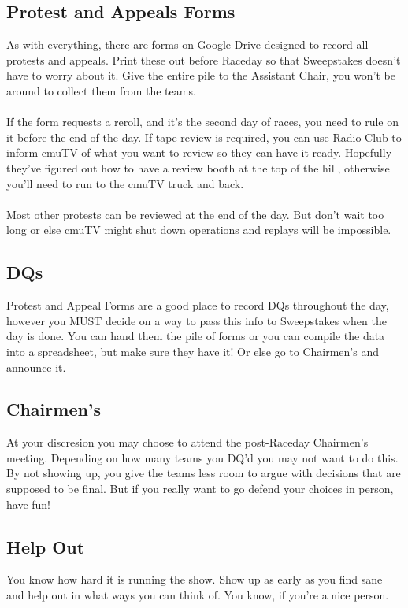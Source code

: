 \subsection{Protest and Appeals Forms}
As with everything, there are forms on Google Drive designed to record all
protests and appeals. Print these out before Raceday so that Sweepstakes
doesn't have to worry about it. Give the entire pile to the Assistant Chair,
you won't be around to collect them from the teams.
\\\\
If the form requests a reroll, and it's the second day of races, you need
to rule on it before the end of the day. If tape review is required, you can
use Radio Club to inform cmuTV of what you want to review so they can have it
ready. Hopefully they've figured out how to have a review booth at the top
of the hill, otherwise you'll need to run to the cmuTV truck and back.
\\\\
Most other protests can be reviewed at the end of the day. But don't wait too
long or else cmuTV might shut down operations and replays will be impossible.

\subsection{DQs}
Protest and Appeal Forms are a good place to record DQs throughout the day,
however you MUST decide on a way to pass this info to Sweepstakes when the
day is done. You can hand them the pile of forms or you can compile the data
into a spreadsheet, but make sure they have it! Or else go to Chairmen's
and announce it.

\subsection{Chairmen's}
At your discresion you may choose to attend the post-Raceday Chairmen's
meeting. Depending on how many teams you DQ'd you may not want to do this.
By not showing up, you give the teams less room to argue with decisions
that are supposed to be final. But if you really want to go defend your choices
in person, have fun!

\subsection{Help Out}
You know how hard it is running the show. Show up as early as you find sane
and help out in what ways you can think of. You know, if you're a nice person.
